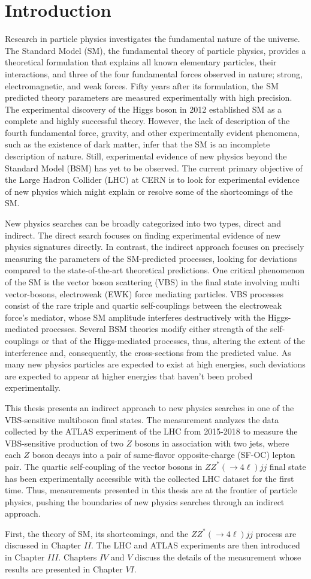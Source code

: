 \part{\LARGE{Introduction}}
\label{sec:Introduction}
Research in particle physics investigates the fundamental nature of the universe. The Standard Model (SM), the fundamental theory of particle physics, provides a theoretical formulation that explains all known elementary particles, their interactions, and three of the four fundamental forces observed in nature; strong, electromagnetic, and weak forces. Fifty years after its formulation, the SM predicted theory parameters are measured experimentally with high precision. The experimental discovery of the Higgs boson in 2012 established SM as a complete and highly successful theory. However, the lack of description of the fourth fundamental force, gravity, and other experimentally evident phenomena, such as the existence of dark matter, infer that the SM is an incomplete description of nature. Still, experimental evidence of new physics beyond the Standard Model (BSM) has yet to be observed. The current primary objective of the Large Hadron Collider (LHC) at CERN is to look for experimental evidence of new physics which might explain or resolve some of the shortcomings of the SM. 

New physics searches can be broadly categorized into two types, direct and indirect. The direct search focuses on finding experimental evidence of new physics signatures directly. In contrast, the indirect approach focuses on precisely measuring the parameters of the SM-predicted processes, looking for deviations compared to the state-of-the-art theoretical predictions. One critical phenomenon of the SM is the vector boson scattering (VBS) in the final state involving multi vector-bosons, electroweak (EWK) force mediating particles. VBS processes consist of the rare triple and quartic self-couplings between the electroweak force's mediator, whose SM amplitude interferes destructively with the Higgs-mediated processes. Several BSM theories modify either strength of the self-couplings or that of the Higgs-mediated processes, thus, altering the extent of the interference and, consequently, the cross-sections from the predicted value. As many new physics particles are expected to exist at high energies, such deviations are expected to appear at higher energies that haven't been probed experimentally. 

This thesis presents an indirect approach to new physics searches in one of the VBS-sensitive multiboson final states. The measurement analyzes the data collected by the ATLAS experiment of the LHC from 2015-2018 to measure the VBS-sensitive production of two $Z$ bosons in association with two jets, where each $Z$ boson decays into a pair of same-flavor opposite-charge (SF-OC) lepton pair. The quartic self-coupling of the vector bosons in $ZZ^*(\rightarrow 4\ell)jj$ final state has been experimentally accessible with the collected LHC dataset for the first time. Thus, measurements presented in this thesis are at the frontier of particle physics, pushing the boundaries of new physics searches through an indirect approach. 

First, the theory of SM, its shortcomings, and the $ZZ^*(\rightarrow 4\ell)jj$ process are discussed in Chapter $II$. The LHC and ATLAS experiments are then introduced in Chapter $III$. Chapters $IV$ and $V$ discuss the details of the measurement whose results are presented in Chapter $VI$. 
